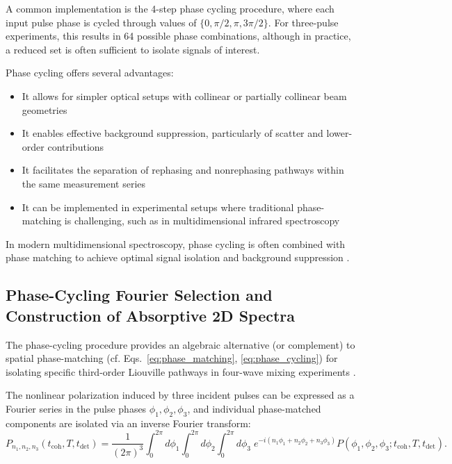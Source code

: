 \noindent A common implementation is the 4-step phase cycling procedure, where each input pulse phase is cycled through values of $\{0, \pi/2, \pi, 3\pi/2\}$. For three-pulse experiments, this results in 64 possible phase combinations, although in practice, a reduced set is often sufficient to isolate signals of interest.

\noindent Phase cycling offers several advantages:

\begin{itemize}
	\item It allows for simpler optical setups with collinear or partially collinear beam geometries
	\item It enables effective background suppression, particularly of scatter and lower-order contributions
	\item It facilitates the separation of rephasing and nonrephasing pathways within the same measurement series
	\item It can be implemented in experimental setups where traditional phase-matching is challenging, such as in multidimensional infrared spectroscopy
\end{itemize}

\noindent In modern multidimensional spectroscopy, phase cycling is often combined with phase matching to achieve optimal signal isolation and background suppression \cite{huang-fuetal2024developmentphasecyclinginterfacespecific, tianetal2003femtosecondphasecoherenttwodimensional}.

\subsection{Phase-Cycling Fourier Selection and Construction of Absorptive 2D Spectra}
\label{subsec:phase_cycling_fourier_selection}

\noindent The phase-cycling procedure provides an algebraic alternative (or complement) to spatial phase-matching (cf. Eqs.~\eqref{eq:phase_matching}, \eqref{eq:phase_cycling}) for isolating specific third-order Liouville pathways in four-wave mixing experiments \cite{mukamel1995principlesnonlinearoptical, cho2009twodimensionalopticalspectroscopy, jonas2003twodimensionalfemtosecondspectroscopy, brixneretal2004phasestabilizedtwodimensionalelectronic, greenetal2024vibrationalcoherenceshalfbroadband}.

\noindent The nonlinear polarization induced by three incident pulses can be expressed as a Fourier series in the pulse phases $\phi_1, \phi_2, \phi_3$, and individual phase-matched components are isolated via an inverse Fourier transform:
\begin{equation}
	P_{n_1,n_2,n_3}(t_{\text{coh}},T,t_{\text{det}}) =
	\frac{1}{(2\pi)^3} \int_{0}^{2\pi} \!\! d\phi_1
	\int_{0}^{2\pi} \!\! d\phi_2
	\int_{0}^{2\pi} \!\! d\phi_3 \;
	e^{-i(n_1\phi_1+n_2\phi_2+n_3\phi_3)}
	P(\phi_1,\phi_2,\phi_3;t_{\text{coh}},T,t_{\text{det}}).
	\label{eq:continuous_phase_cycling}
\end{equation}

